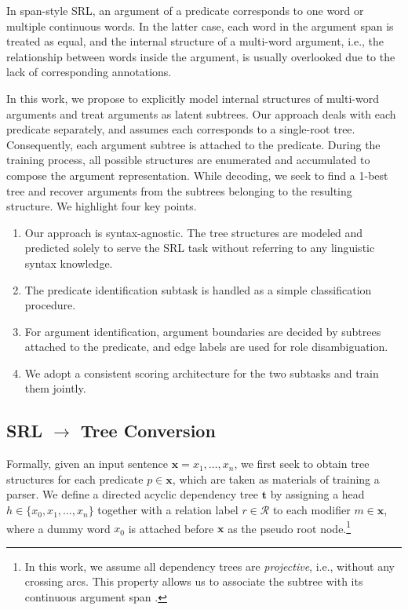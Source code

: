 \documentclass[11pt]{article}
\begin{document}
In span-style SRL, an argument of a predicate corresponds to one word or multiple continuous words.
In the latter case, each word in the argument span is treated as equal, and the internal structure of a multi-word argument, i.e., the relationship between words inside the argument, is usually overlooked due to the lack of corresponding annotations.

In this work, we propose to explicitly model internal structures of multi-word arguments and treat arguments as latent subtrees.
Our approach deals with each predicate separately, and assumes each corresponds to a single-root tree.
Consequently, each argument subtree is attached to the predicate.
During the training process, all possible structures are enumerated and accumulated to compose the argument representation.
While decoding, we seek to find a 1-best tree and recover arguments from the subtrees belonging to the resulting structure.
We highlight four key points.
\begin{enumerate}[leftmargin=15pt,label=\roman*]
    \item Our approach is syntax-agnostic.
          The tree structures are modeled and predicted solely to serve the SRL task without referring to any linguistic syntax knowledge.
    \item The predicate identification subtask is handled as a simple classification procedure.
    \item For argument identification, argument boundaries are decided by subtrees attached to the predicate, and edge labels are used for role disambiguation.
    \item We adopt a consistent scoring architecture for the two subtasks and train them jointly.
\end{enumerate}



\subsection{SRL $\rightarrow$ Tree Conversion}\label{sec:srl-tree}

Formally, given an input sentence $\boldsymbol{x}=x_1,\dots, x_n$, we first seek to obtain tree structures for each predicate $p\in \boldsymbol{x}$, which are taken as materials of training a parser.
We define a directed acyclic dependency tree $\boldsymbol{t}$ by assigning a head $h\in\{x_0,x_1,\dots,x_n\}$ together with a relation label $r\in \mathcal{R}$ to each modifier $m \in \boldsymbol{x}$, where a dummy word $x_0$ is attached before $\boldsymbol{x}$ as the pseudo root node.\footnote{
    In this work, we assume all dependency trees are \emph{projective}, i.e., without any crossing arcs.
    This property allows us to associate the subtree with its continuous argument span \cite{kong-etal-2015-transforming}.
}
\end{document}
